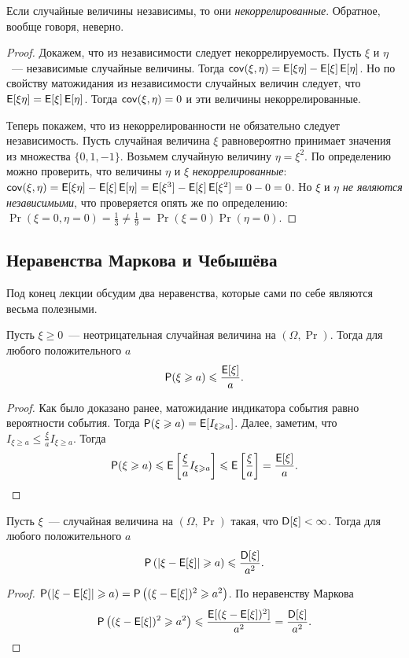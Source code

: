\begin{theorem}
    Если случайные величины независимы, то они \emph{некоррелированные}. Обратное, вообще говоря, неверно.
\end{theorem}
\begin{proof}
    Докажем, что из независимости следует некоррелируемость. Пусть \(\xi\) и \(\eta\)~--- независимые случайные величины. Тогда \(\cov(\xi, \eta) = \E[\xi\eta] - \E[\xi]\E[\eta]\). Но по свойству матожидания из независимости случайных величин следует, что \(\E[\xi\eta] = \E[\xi]\E[\eta]\). Тогда \(\operatorname{\mathsf{cov}}(\xi, \eta) = 0\) и эти величины некоррелированные.
    
    Теперь покажем, что из некоррелированности не обязательно следует независимость. Пусть случайная величина \(\xi\) равновероятно принимает значения из множества \(\{0, 1, -1\}\). Возьмем случайную величину \(\eta = \xi^2\). По определению можно проверить, что величины \(\eta\) и \(\xi\) \emph{некоррелированные}: \(\cov(\xi, \eta) = \E[\xi\eta] - \E[\xi]\E[\eta] = \E[\xi^3] - \E[\xi]\E[\xi^2] = 0 - 0 = 0\). Но \(\xi\) и \(\eta\) \emph{не являются независимыми}, что проверяется опять же по определению: \(\Pr(\xi = 0, \eta = 0) = \frac{1}{3} \neq \frac{1}{9} = \Pr(\xi = 0)\Pr(\eta = 0)\).
\end{proof}

\subsection{Неравенства Маркова и Чебышёва}
Под конец лекции обсудим два неравенства, которые сами по себе являются весьма полезными.
\begin{theorem}
    Пусть \(\xi \geq 0\)~--- неотрицательная случайная величина на \((\Omega, \Pr)\). Тогда для любого положительного \(a\) \[\Pr(\xi \geq a) \leq \dfrac{\E[\xi]}{a}.\]
\end{theorem}
\begin{proof}
    Как было доказано ранее, матожидание индикатора события равно вероятности события. Тогда \(\Pr(\xi \geq a) = \E[I_{\xi \geq a}]\). Далее, заметим, что \(I_{\xi \geq a} \leq \frac{\xi}{a}I_{\xi \geq a}\). Тогда \[\Pr(\xi \geq a) \leq \E\left[\frac{\xi}{a}I_{\xi \geq a}\right] \leq \E\left[\frac{\xi}{a}\right] = \frac{\E[\xi]}{a}.\qedhere\]
\end{proof}
\begin{theorem}
    Пусть \(\xi\)~--- случайная величина на \((\Omega, \Pr)\) такая, что \(\D[\xi] < \infty\). Тогда для любого положительного \(a\) \[\Pr\left(|\xi - \E[\xi]| \geq a\right) \leq \frac{\D[\xi]}{a^2}.\]
\end{theorem}
\begin{proof}
    \(\Pr(|\xi - \E[\xi]| \geq a) = \Pr\left((\xi - \E[\xi])^2 \geq a^2\right)\). По неравенству Маркова
    \[\Pr\left((\xi - \E[\xi])^2 \geq a^2\right) \leq \frac{\E[(\xi - \E[\xi])^2]}{a^2} = \frac{\D[\xi]}{a^2}.\qedhere\]
\end{proof}